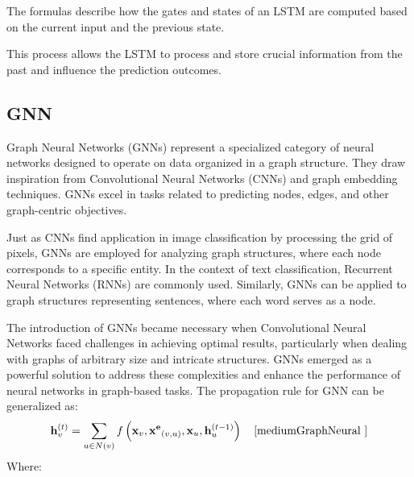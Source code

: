 \documentclass{ieeeojies}
\begin{document}
The formulas describe how the gates and states of an LSTM
are computed based on the current input and the previous state.

This process allows the LSTM to process and store crucial
information from the past and influence the prediction
outcomes.

\subsection{GNN}
\hspace{0.3cm}Graph Neural Networks (GNNs) represent a specialized category of neural networks designed to operate on data organized in a graph structure. They draw inspiration from Convolutional Neural Networks (CNNs) and graph embedding techniques. GNNs excel in tasks related to predicting nodes, edges, and other graph-centric objectives.

Just as CNNs find application in image classification by processing the grid of pixels, GNNs are employed for analyzing graph structures, where each node corresponds to a specific entity. In the context of text classification, Recurrent Neural Networks (RNNs) are commonly used. Similarly, GNNs can be applied to graph structures representing sentences, where each word serves as a node.

The introduction of GNNs became necessary when Convolutional Neural Networks faced challenges in achieving optimal results, particularly when dealing with graphs of arbitrary size and intricate structures. GNNs emerged as a powerful solution to address these complexities and enhance the performance of neural networks in graph-based tasks\cite{datacampComprehensiveIntroduction}.
The propagation rule for GNN can be generalized as:
$$
\mathbf{h}_v^{(t)}=\sum_{u \in N(v)} f\left(\mathbf{x}_v, \mathbf{x}^{\mathbf{e}}{ }_{(v, u)}, \mathbf{x}_u, \mathbf{h}_u^{(t-1)}\right) \quad \cite{mediumGraphNeural }
$$
Where:\\
\end{document}
